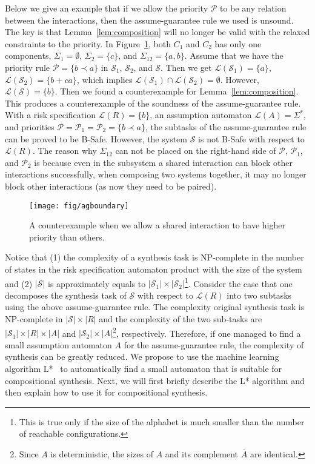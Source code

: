 \documentclass[10pt, a4paper, onecolumn, conference, compsocconf]{IEEEtran}
\begin{document}
Below we give an example that if we allow the priority $\mathcal{P}$ to be any relation between the interactions, then the assume-guarantee rule we used is unsound. The key is that Lemma~\ref{lem:composition} will no longer be valid with the relaxed constraints to the priority.
In Figure~\ref{fig:agboundary}, both $C_1$ and $C_2$ has only one components, $\Sigma_1=\emptyset$, $\Sigma_2=\{c\}$, and $\Sigma_{12}=\{a,b\}$.
Assume that we have the priority rule $\mathcal{P}=\{b\prec a\}$ in $\mathcal{S}_1$, $\mathcal{S}_2$, and $\mathcal{S}$.
Then we get $\mathcal{L}(\mathcal{S}_1)=\{a\}$, $\mathcal{L}(\mathcal{S}_2)=\{b + ca\}$, which implies $\mathcal{L}(\mathcal{S}_1)\cap\mathcal{L}(\mathcal{S}_2)=\emptyset$. However, $\mathcal{L}(\mathcal{S})=\{b\}$. Then we found a counterexample for Lemma~\ref{lem:composition}. This produces a counterexample of the soundness of the assume-guarantee rule.
With a risk specification $\mathcal{L}(R)=\{b\}$, an assumption automaton $\mathcal{L}(A)=\Sigma^*$, and priorities $\mathcal{P}=\mathcal{P}_1=\mathcal{P}_2=\{b \prec a\}$,
the subtasks of the assume-guarantee rule can be proved to be B-Safe. However, the system $\mathcal{S}$ is not B-Safe with respect to $\mathcal{L}(R)$. The reason why $\Sigma_{12}$ can not be placed on the right-hand side of $\mathcal{P}$, $\mathcal{P}_1$, and $\mathcal{P}_2$ is because even in the subsystem a shared interaction can block other interactions successfully, when composing two systems together, it may no longer block other interactions (as now they need to be paired).

\begin{figure}
\centering
 \texttt{[image: fig/agboundary]}
  \caption{A counterexample when we allow a shared interaction to have higher priority than others.}
 \label{fig:agboundary}
\end{figure}

Notice that (1) the complexity of a synthesis task is NP-complete in the number of states in the risk specification automaton product with the size of the system and (2) $|\mathcal{S}|$ is approximately equals to $|\mathcal{S}_1| \times |\mathcal{S}_2|$\footnote{This is true only if the size of the alphabet is much smaller than the number of reachable configurations.}.
Consider the case that one decomposes the synthesis task of $\mathcal{S}$ with respect to $\mathcal{L}(R)$ into two subtasks using the above assume-guarantee rule. The complexity original synthesis task is NP-complete in $|\mathcal{S}|\times|R|$ and the complexity of the two sub-tasks are $|\mathcal{S}_1|\times|R|\times|A|$ and $|\mathcal{S}_2|\times|A|$\footnote{Since $A$ is deterministic, the sizes of $A$ and its complement $\overline{A}$ are identical.}, respectively.
Therefore, if one managed to find a small assumption automaton $A$ for the assume-guarantee rule, the complexity of synthesis can be greatly reduced. We propose to use the machine learning algorithm L*~\cite{angluin1987learning} to automatically find a small automaton that is suitable for compositional synthesis. Next, we will first briefly describe the L* algorithm and then explain how to use it for compositional synthesis.
\end{document}
